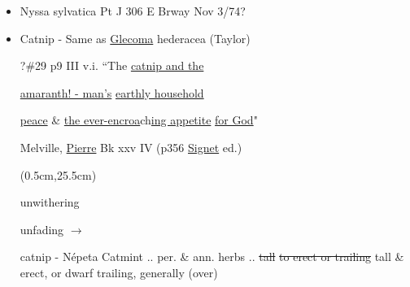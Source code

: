 \documentclass[a4paper,10pt]{article}
\begin{document}
\begin{flushleft}
\begin{itemize}
\begin{textblock*}{3.22in}
\begin{minipage}{3.22in}
        \ul{Heuchera}\par
        also called\par
         alumroot\par
        (saxifrage\par
        family)
        \normalsize
  \end{minipage}%
  \end{textblock*}%
\color{blue}
[the relation to those]{$\stackrel{\hbox{identified*}}{\hbox{Oct 30/74}}$}\par
*neighbor called it wild strawberry, but\par 
no berry\par
See Gray - The name of a nymph etc orig a water plant 
?Balkelot? - sour gum, pepperidge - identified? \color{red} (\ul{Cheyney} What Tree is That?)
\color{blue}
\item Nyssa sylvatica Pt J 306 E Brway Nov 3/74?


\item Catnip - Same as \underline{Glecoma} hederacea (Taylor)\par
{}
?\#29 p9 III v.i. ``The \ul{catnip and the} \par
\ul{amaranth! - man's} \ul{earthly household} \par
\ul{peace} \& \ul{the ever-encroa}ch\ul{ing appetite} \ul{for God}"\par
{}
Melville, \ul{Pierre} Bk xxv IV (p356 \ul{Signet} ed.)
\color{red}
\begin{textblock*}{2in}(0.5cm,25.5cm)%
    \small
    \begin{minipage}{2in} 
        \color{red}
        unwithering\par
        unfading $\rightarrow$
        \normalsize
  \end{minipage}%
  \end{textblock*}%

\color{red}
\begin{adjustwidth}{-0.5in}{-0.5in}
catnip - N\'epeta %
Catmint .. per. \& ann. herbs .. \sout{tall}
\sout{to erect or trailing} tall \& erect, or dwarf trailing, generally (over)
\end{adjustwidth}
\end{itemize}
\end{flushleft}
\end{document}
